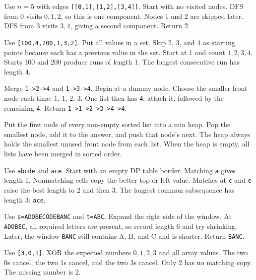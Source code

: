 \expandafter\def\csname lessontrace@42\endcsname{\visualtrace
  {Use \(n=5\) with edges \texttt{[[0,1],[1,2],[3,4]]}. Start with no visited nodes.}
  {DFS from 0 visits \(0,1,2\), so this is one component.}
  {Nodes 1 and 2 are skipped later. DFS from 3 visits \(3,4\), giving a second component.}
  {Return \(2\).}}

\expandafter\def\csname lessontrace@43\endcsname{\visualtrace
  {Use \texttt{[100,4,200,1,3,2]}. Put all values in a set.}
  {Skip 2, 3, and 4 as starting points because each has a previous value in the set.}
  {Start at 1 and count \(1,2,3,4\). Starts 100 and 200 produce runs of length 1.}
  {The longest consecutive run has length \(4\).}}

\expandafter\def\csname lessontrace@44\endcsname{\visualtrace
  {Merge \texttt{1->2->4} and \texttt{1->3->4}. Begin at a dummy node.}
  {Choose the smaller front node each time: 1, 1, 2, 3.}
  {One list then has \texttt{4}; attach it, followed by the remaining \texttt{4}.}
  {Return \texttt{1->1->2->3->4->4}.}}

\expandafter\def\csname lessontrace@45\endcsname{\visualtrace
  {Put the first node of every non-empty sorted list into a min heap.}
  {Pop the smallest node, add it to the answer, and push that node's next.}
  {The heap always holds the smallest unused front node from each list.}
  {When the heap is empty, all lists have been merged in sorted order.}}

\expandafter\def\csname lessontrace@46\endcsname{\visualtrace
  {Use \texttt{abcde} and \texttt{ace}. Start with an empty DP table border.}
  {Matching \texttt{a} gives length 1. Nonmatching cells copy the better top or left value.}
  {Matches at \texttt{c} and \texttt{e} raise the best length to 2 and then 3.}
  {The longest common subsequence has length \(3\): \texttt{ace}.}}

\expandafter\def\csname lessontrace@47\endcsname{\visualtrace
  {Use \texttt{s=ADOBECODEBANC} and \texttt{t=ABC}. Expand the right side of the window.}
  {At \texttt{ADOBEC}, all required letters are present, so record length 6 and try shrinking.}
  {Later, the window \texttt{BANC} still contains A, B, and C and is shorter.}
  {Return \texttt{BANC}.}}

\expandafter\def\csname lessontrace@48\endcsname{\visualtrace
  {Use \texttt{[3,0,1]}. XOR the expected numbers \(0,1,2,3\) and all array values.}
  {The two 0s cancel, the two 1s cancel, and the two 3s cancel.}
  {Only 2 has no matching copy.}
  {The missing number is \(2\).}}

